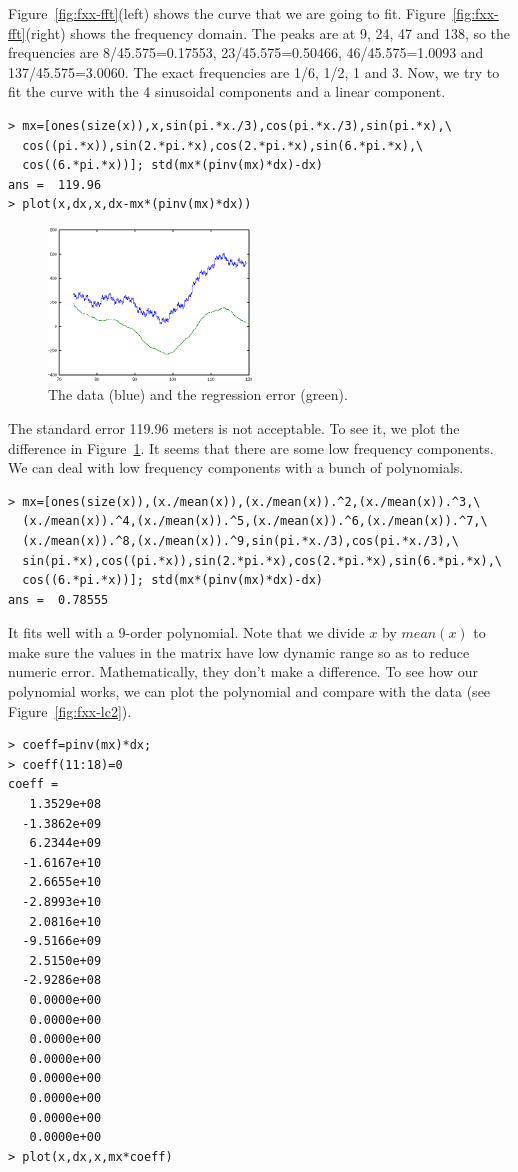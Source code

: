\documentclass[a4paper]{article}
\begin{document}
Figure~\ref{fig:fxx-fft}(left) shows the curve that we are going to fit.
Figure~\ref{fig:fxx-fft}(right) shows the frequency domain.
The peaks are at 9, 24, 47 and 138, so the frequencies are 8/45.575=0.17553,
23/45.575=0.50466, 46/45.575=1.0093 and 137/45.575=3.0060.
The exact frequencies are 1/6, 1/2, 1 and 3.
Now, we try to fit the curve with the 4 sinusoidal components and
a linear component.
\begin{verbatim}
> mx=[ones(size(x)),x,sin(pi.*x./3),cos(pi.*x./3),sin(pi.*x),\
  cos((pi.*x)),sin(2.*pi.*x),cos(2.*pi.*x),sin(6.*pi.*x),\
  cos((6.*pi.*x))]; std(mx*(pinv(mx)*dx)-dx)
ans =  119.96
> plot(x,dx,x,dx-mx*(pinv(mx)*dx))
\end{verbatim}
\begin{figure}[htb]
\begin{center}
\includegraphics[width=0.48\textwidth]{fxx-lc1.png}
\end{center}
\caption{The data (blue) and the regression error (green).}
\label{fig:fxx-lc1}
\end{figure}
The standard error 119.96 meters is not acceptable.
To see it, we plot the difference in Figure~\ref{fig:fxx-lc1}.
It seems that there are some low frequency components.
We can deal with low frequency components with a bunch of polynomials.
\begin{verbatim}
> mx=[ones(size(x)),(x./mean(x)),(x./mean(x)).^2,(x./mean(x)).^3,\
  (x./mean(x)).^4,(x./mean(x)).^5,(x./mean(x)).^6,(x./mean(x)).^7,\
  (x./mean(x)).^8,(x./mean(x)).^9,sin(pi.*x./3),cos(pi.*x./3),\
  sin(pi.*x),cos((pi.*x)),sin(2.*pi.*x),cos(2.*pi.*x),sin(6.*pi.*x),\
  cos((6.*pi.*x))]; std(mx*(pinv(mx)*dx)-dx)
ans =  0.78555
\end{verbatim}
It fits well with a 9-order polynomial.
Note that we divide $x$ by $mean(x)$ to make sure the values in the matrix
have low dynamic range so as to reduce numeric error.
Mathematically, they don't make a difference.
To see how our polynomial works, we can plot the polynomial and compare with
the data (see Figure~\ref{fig:fxx-lc2}).
\begin{verbatim}
> coeff=pinv(mx)*dx;
> coeff(11:18)=0
coeff =
   1.3529e+08
  -1.3862e+09
   6.2344e+09
  -1.6167e+10
   2.6655e+10
  -2.8993e+10
   2.0816e+10
  -9.5166e+09
   2.5150e+09
  -2.9286e+08
   0.0000e+00
   0.0000e+00
   0.0000e+00
   0.0000e+00
   0.0000e+00
   0.0000e+00
   0.0000e+00
   0.0000e+00
> plot(x,dx,x,mx*coeff)
\end{verbatim}
\end{document}
